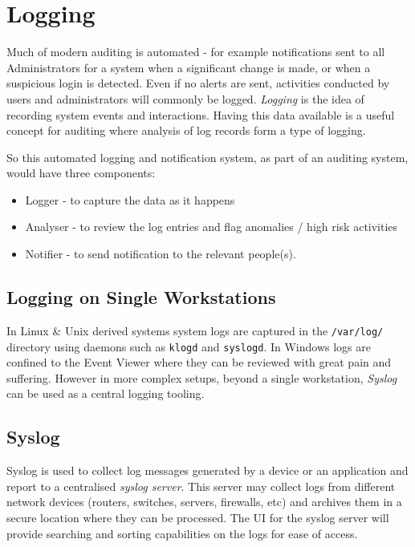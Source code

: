 \section{Logging}
Much of modern auditing is automated - for example notifications sent to all Administrators for a system when a significant change is made, or when a suspicious login is detected. Even if no alerts are sent, activities conducted by users and administrators will commonly be logged. \textit{Logging} is the idea of recording system events and interactions. Having this data available is a useful concept for auditing where analysis of log records form a type of logging. 

So this automated logging and notification system, as part of an auditing system, would have three components:
\begin{itemize}
    \item Logger - to capture the data as it happens
    \item Analyser - to review the log entries and flag anomalies / high risk activities
    \item Notifier - to send notification to the relevant people(s).
\end{itemize}

\subsection{Logging on Single Workstations}
In Linux \& Unix derived systems system logs are captured in the \verb|/var/log/| directory using daemons such as \verb|klogd| and \verb|syslogd|. In Windows logs are confined to the Event Viewer where they can be reviewed with great pain and suffering. However in more complex setups, beyond a single workstation, \textit{Syslog} can be used as a central logging tooling.

\subsection{Syslog}
Syslog is used to collect log messages generated by a device or an application and report to a centralised \textit{syslog server}. This server may collect logs from different network devices (routers, switches, servers, firewalls, etc) and archives them in a secure location where they can be processed. The UI for the syslog server will provide searching and sorting capabilities on the logs for ease of access. 

